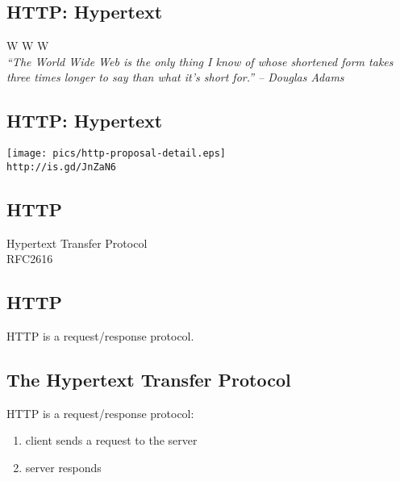\documentclass[xga]{xdvislides}
\begin{document}
\subsection{HTTP: Hypertext}
\vspace{.5in}
\begin{center}
	\Huge
	W W W
	\\
\vspace{.5in}
	{\em ``The World Wide Web is the only thing I know of whose shortened form
	takes three times longer to say than what it's short for.'' -- Douglas Adams}
\end{center}
\Normalsize


\subsection{HTTP: Hypertext}
\begin{center}
	\texttt{[image: pics/http-proposal-detail.eps]} \\
	\vspace{.5in}
	\verb+http://is.gd/JnZaN6+
\end{center}

\subsection{HTTP}
\vspace{.5in}
\begin{center}
	\Huge
	Hypertext Transfer Protocol
	\\
	\vspace{.5in}
	RFC2616
\end{center}
\Normalsize

\subsection{HTTP}
\vspace{.5in}
\begin{center}
	\Huge
	HTTP is a request/response protocol.
\end{center}
\Normalsize

\subsection{The Hypertext Transfer Protocol}
HTTP is a request/response protocol:
\begin{enumerate}
	\item client sends a request to the server
	\item server responds
\end{enumerate}
\end{document}
